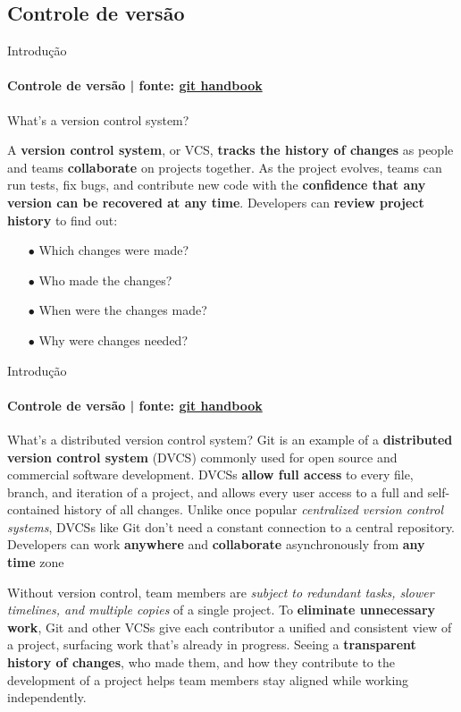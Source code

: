 \documentclass[xcolor=dvipsnames,t]{beamer}
\begin{document}
\subsection{Controle de versão}
\begin{frame}{Introdução}
\framesubtitle{Controle de versão | fonte: \href{https://guides.github.com/introduction/git-handbook/}{\color{blue} git handbook}}
What’s a version control system?

A \textbf{version control system}, or VCS, \textbf{tracks the history of changes} as people and teams \textbf{collaborate} on projects together. As the project evolves, teams can run tests, fix bugs, and contribute new code with the \textbf{confidence that any version can be recovered at any time}. Developers can \textbf{review project history} to find out:

\begin{itemize}
	\item[$ \bullet $] Which changes were made?
	\item[$ \bullet $] Who made the changes?
	\item[$ \bullet $] When were the changes made?
	\item[$ \bullet $] Why were changes needed?
\end{itemize}

\end{frame}

\begin{frame}{Introdução}
\framesubtitle{Controle de versão | fonte: \href{https://guides.github.com/introduction/git-handbook/}{\color{blue} git handbook}}
\small

\begin{exampleblock}{What’s a distributed version control system?}
	Git is an example of a \textbf{distributed version control system} (DVCS) commonly used for open source and commercial software development. DVCSs \textbf{allow full access} to every file, branch, and iteration of a project, and allows every user access to a full and self-contained history of all changes. Unlike once popular \textit{centralized version control systems}, DVCSs like Git don’t need a constant connection to a central repository. Developers can work \textbf{anywhere} and \textbf{collaborate} asynchronously from \textbf{any time} zone
\end{exampleblock}

\begin{block}{}
	Without version control, team members are \textit{subject to redundant tasks, slower timelines, and multiple copies} of a single project. To \textbf{eliminate unnecessary work}, Git and other VCSs give each contributor a unified and consistent view of a project, surfacing work that’s already in progress. Seeing a \textbf{transparent history of changes}, who made them, and how they contribute to the development of a project helps team members stay aligned while working independently.
\end{block}

\end{frame}
\end{document}
